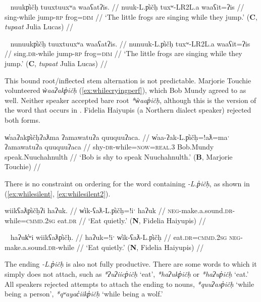 \ex~ \label{ex:whilesinging}
\begingl
\glpreamble nuukp̓ičḥ tuuxtuuxʷa waaʕatʔis. //
\gla nuuk-L.p̓ičḥ tuxʷ-LR2L.a waaʕit=ʔis //
\glb sing-while jump-\textsc{rp} frog=\textsc{dim} //
\glft `The little frogs are singing while they jump.' (\textbf{C}, \textit{tupaat} Julia Lucas) //
\endgl
\xe

\ex~ \label{ex:whilesinging2}
\begingl
\glpreamble nunuukp̓ičḥ tuuxtuuxʷa waaʕatʔis. //
\gla nunuuk-L.p̓ičḥ tuxʷ-LR2L.a waaʕit=ʔis //
\glb sing.\textsc{dr}-while jump-\textsc{rp} frog=\textsc{dim} //
\glft `The little frogs are singing while they jump.' (\textbf{C}, \textit{tupaat} Julia Lucas) //
\endgl
\xe

This bound root/inflected stem alternation is not predictable. Marjorie Touchie volunteered \textit{w̓aaʔakp̓ičḥ} (\ref{ex:whilecryingperf}), which Bob Mundy agreed to as well. Neither speaker accepted bare root \textit{*w̓aap̓ičḥ}, although this is the version of the word that occurs in \cite{sapir1939}. Fidelia Haiyupis (a Northern dialect speaker) rejected both forms.

\ex \label{ex:whilecryingperf}
\begingl
\glpreamble w̓aaʔakp̓ičḥʔaƛma ʔamawatuʔa quuquuʔaca. //
\gla w̓aa-ʔak-L.p̓ičḥ=!aƛ=maˑ ʔamawatuʔa quuquuʔaca //
\glb shy-\textsc{dr}-while=\textsc{now}=\textsc{real.3} Bob.Mundy speak.Nuuchahnulth //
\glft `Bob is shy to speak Nuuchahnulth.' (\textbf{B}, Marjorie Touchie) //
\endgl
\xe

There is no constraint on ordering for the word containing \textit{-L.p̓ičḥ}, as shown in (\ref{ex:whilesilent}, \ref{ex:whilesilent2}).

\ex \label{ex:whilesilent}
\begingl
\glpreamble wiikʕaƛp̓ičḥʔi haʔuk. //
\gla w̓ik-ʕaƛ-L.p̓ičḥ=!iˑ haʔuk //
\glb \textsc{neg}-make.a.sound.\textsc{dr}-while=\textsc{cmmd.2sg} eat.\textsc{dr} //
\glft `Eat quietly.' (\textbf{N}, Fidelia Haiyupis) //
\endgl
\xe

\ex~ \label{ex:whilesilent2}
\begingl
\glpreamble haʔuk̓ʷi wiikʕaƛp̓ičḥ. //
\gla haʔuk=!iˑ w̓ik-ʕaƛ-L.p̓ičḥ //
\glb eat.\textsc{dr}=\textsc{cmmd.2sg} \textsc{neg}-make.a.sound.\textsc{dr}-while //
\glft `Eat quietly.' (\textbf{N}, Fidelia Haiyupis) //
\endgl
\xe

The ending \textit{-L.p̓ičḥ} is also not fully productive. There are some words to which it simply does not attach, such as \textit{*ʔuʔiicp̓ičḥ} `eat', \textit{*haʔukp̓ičḥ} or \textit{*haʔup̓ičḥ} `eat.' All speakers rejected attempts to attach the ending to nouns, \textit{*quuʔasp̓ičḥ} `while being a person', \textit{*qʷayac̓iikp̓ičḥ} `while being a wolf.'

